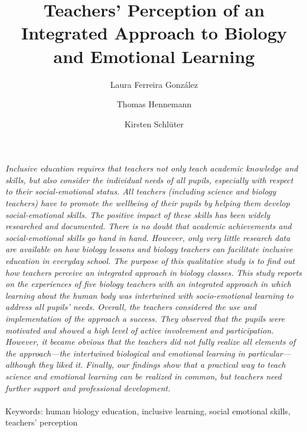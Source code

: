 \documentclass[11.5pt]{sig-alternate} %
\makeatletter
\let\oldabstract\abstract
\let\oldendabstract\endabstract
\renewenvironment{abstract} %
{\renewenvironment{quotation}%
               {\list{}{\addtolength{\leftmargin}{1em} %
                        \listparindent 1.5em%
                        \itemindent    \listparindent%
                        \rightmargin   \leftmargin%
                        \parsep        \z@ \@plus\p@}%
                \item\relax}%
               {\endlist}%
\oldabstract}
{\oldendabstract}
\makeatother
\begin{document}
\title{Teachers’ Perception of an Integrated Approach to Biology and Emotional Learning}

\author[1]{\large \color{blue}Laura Ferreira González}
\author[1]{\large \color{blue}Thomas Hennemann}
\author[1]{\large \color{blue}Kirsten Schlüter}

\toappear{}
\maketitle
\begin{@twocolumnfalse} 
\begin{abstract}
\item 
\textit{Inclusive education requires that teachers not only teach academic knowledge and skills, but also consider the individual needs of all pupils, especially with respect to their social-emotional status. All teachers (including science and biology teachers) have to promote the wellbeing of their pupils by helping them develop social-emotional skills. The positive impact of these skills has been widely researched and documented. There is no doubt that academic achievements and social-emotional skills go hand in hand. However, only very little research data are available on how biology lessons and biology teachers can facilitate inclusive education in everyday school. The purpose of this qualitative study is to find out how teachers perceive an integrated approach in biology classes. This study reports on the experiences of five biology teachers with an integrated approach in which learning about the human body was intertwined with socio-emotional learning to address all pupils’ needs. Overall, the teachers considered the use and implementation of the approach a success. They observed that the pupils were motivated and showed a high level of active involvement and participation. However, it became obvious that the teachers did not fully realize all elements of the approach—the intertwined biological and emotional learning in particular—although they liked it. Finally, our findings show that a practical way to teach science and emotional learning can be realized in common, but teachers need further support and professional development.}
\\ \\
Keywords: human biology education, inclusive learning, social emotional skills, teachers’ perception
\end{abstract}
\end{@twocolumnfalse}
\end{document}
